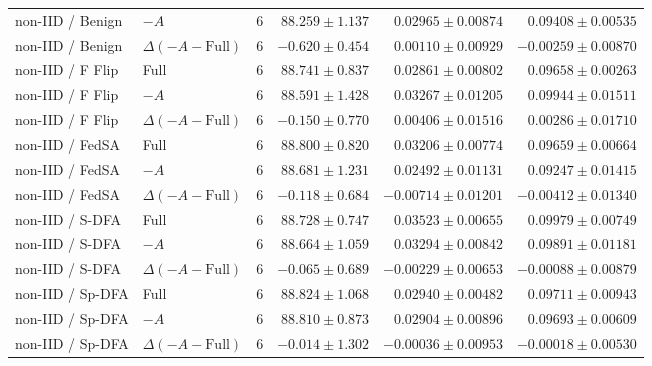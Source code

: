 \begin{table}[t]
\begin{tabular}{llrrrr}
non-IID / Benign & $-A$ & 6 & $88.259 \pm 1.137$ & $0.02965 \pm 0.00874$ & $0.09408 \pm 0.00535$ \\
non-IID / Benign & $\Delta(-A-\mathrm{Full})$ & 6 & $-0.620 \pm 0.454$ & $0.00110 \pm 0.00929$ & $-0.00259 \pm 0.00870$ \\
non-IID / F Flip & Full & 6 & $88.741 \pm 0.837$ & $0.02861 \pm 0.00802$ & $0.09658 \pm 0.00263$ \\
non-IID / F Flip & $-A$ & 6 & $88.591 \pm 1.428$ & $0.03267 \pm 0.01205$ & $0.09944 \pm 0.01511$ \\
non-IID / F Flip & $\Delta(-A-\mathrm{Full})$ & 6 & $-0.150 \pm 0.770$ & $0.00406 \pm 0.01516$ & $0.00286 \pm 0.01710$ \\
non-IID / FedSA & Full & 6 & $88.800 \pm 0.820$ & $0.03206 \pm 0.00774$ & $0.09659 \pm 0.00664$ \\
non-IID / FedSA & $-A$ & 6 & $88.681 \pm 1.231$ & $0.02492 \pm 0.01131$ & $0.09247 \pm 0.01415$ \\
non-IID / FedSA & $\Delta(-A-\mathrm{Full})$ & 6 & $-0.118 \pm 0.684$ & $-0.00714 \pm 0.01201$ & $-0.00412 \pm 0.01340$ \\
non-IID / S-DFA & Full & 6 & $88.728 \pm 0.747$ & $0.03523 \pm 0.00655$ & $0.09979 \pm 0.00749$ \\
non-IID / S-DFA & $-A$ & 6 & $88.664 \pm 1.059$ & $0.03294 \pm 0.00842$ & $0.09891 \pm 0.01181$ \\
non-IID / S-DFA & $\Delta(-A-\mathrm{Full})$ & 6 & $-0.065 \pm 0.689$ & $-0.00229 \pm 0.00653$ & $-0.00088 \pm 0.00879$ \\
non-IID / Sp-DFA & Full & 6 & $88.824 \pm 1.068$ & $0.02940 \pm 0.00482$ & $0.09711 \pm 0.00943$ \\
non-IID / Sp-DFA & $-A$ & 6 & $88.810 \pm 0.873$ & $0.02904 \pm 0.00896$ & $0.09693 \pm 0.00609$ \\
non-IID / Sp-DFA & $\Delta(-A-\mathrm{Full})$ & 6 & $-0.014 \pm 1.302$ & $-0.00036 \pm 0.00953$ & $-0.00018 \pm 0.00530$ \\
\bottomrule
\end{tabular}
\end{table}

